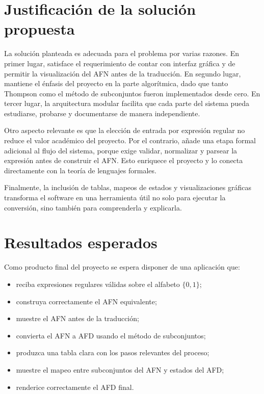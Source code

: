 \documentclass[12pt]{article}
\begin{document}
\section{Justificación de la solución propuesta}

La solución planteada es adecuada para el problema por varias razones. En primer lugar, satisface el requerimiento de contar con interfaz gráfica y de permitir la visualización del AFN antes de la traducción. En segundo lugar, mantiene el énfasis del proyecto en la parte algorítmica, dado que tanto Thompson como el método de subconjuntos fueron implementados desde cero. En tercer lugar, la arquitectura modular facilita que cada parte del sistema pueda estudiarse, probarse y documentarse de manera independiente.

Otro aspecto relevante es que la elección de entrada por expresión regular no reduce el valor académico del proyecto. Por el contrario, añade una etapa formal adicional al flujo del sistema, porque exige validar, normalizar y parsear la expresión antes de construir el AFN. Esto enriquece el proyecto y lo conecta directamente con la teoría de lenguajes formales.

Finalmente, la inclusión de tablas, mapeos de estados y visualizaciones gráficas transforma el software en una herramienta útil no solo para ejecutar la conversión, sino también para comprenderla y explicarla.

\section{Resultados esperados}

Como producto final del proyecto se espera disponer de una aplicación que:
\begin{itemize}
    \item reciba expresiones regulares válidas sobre el alfabeto $\{0,1\}$;
    \item construya correctamente el AFN equivalente;
    \item muestre el AFN antes de la traducción;
    \item convierta el AFN a AFD usando el método de subconjuntos;
    \item produzca una tabla clara con los pasos relevantes del proceso;
    \item muestre el mapeo entre subconjuntos del AFN y estados del AFD;
    \item renderice correctamente el AFD final.
\end{itemize}
\end{document}
